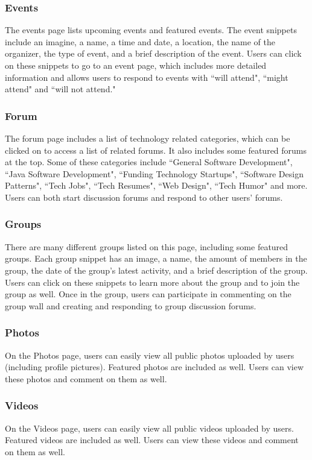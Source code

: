 \subsubsection{Events}
The events page lists upcoming events and featured events. The event snippets include an imagine, a name, a time and date, a location, the name of the organizer, the type of event, and a brief description of the event. Users can click on these snippets to go to an event page, which includes more detailed information and allows users to respond to events with ``will attend", ``might attend" and ``will not attend." 
\subsubsection{Forum}
The forum page includes a list of technology related categories, which can be clicked on to access a list of related forums. It also includes some featured forums at the top. Some of these categories include ``General Software Development", ``Java Software Development", ``Funding Technology Startups", ``Software Design Patterns", ``Tech Jobs", ``Tech Resumes", ``Web Design", ``Tech Humor" and more. Users can both start discussion forums and respond to other users' forums. 
\subsubsection{Groups}
There are many different groups listed on this page, including some featured groups. Each group snippet has an image, a name, the amount of members in the group, the date of the group's latest activity, and a brief description of the group. Users can click on these snippets to learn more about the group and to join the group as well. Once in the group, users can participate in commenting on the group wall and creating and responding to group discussion forums. 
\subsubsection{Photos}
On the Photos page, users can easily view all public photos uploaded by users (including profile pictures). Featured photos are included as well. Users can view these photos and comment on them as well. 
\subsubsection{Videos}
On the Videos page, users can easily view all public videos uploaded by users. Featured videos are included as well. Users can view these videos and comment on them as well. 
